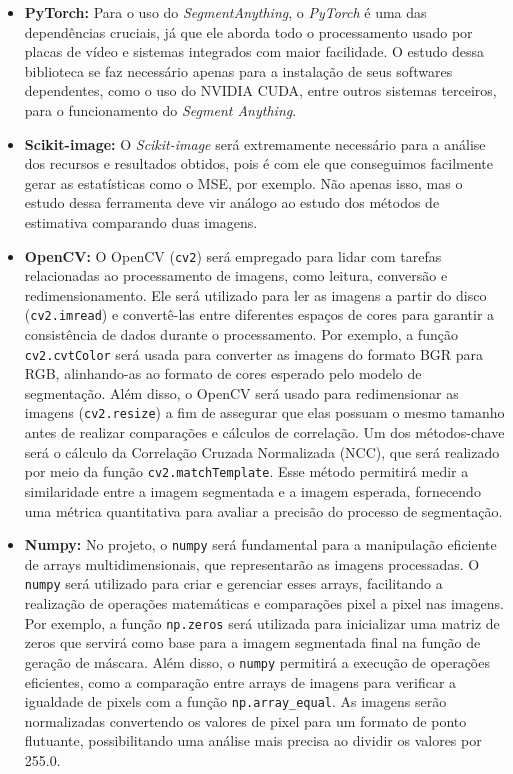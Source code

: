 \begin{itemize}
    \item \textbf{PyTorch:}  
    Para o uso do \textit{SegmentAnything}, o \textit{PyTorch} é uma das dependências cruciais, já que ele aborda todo o processamento usado por placas de vídeo e sistemas integrados com maior facilidade. O estudo dessa biblioteca se faz necessário apenas para a instalação de seus softwares dependentes, como o uso do NVIDIA CUDA, entre outros sistemas terceiros, para o funcionamento do \textit{Segment Anything}.

    \item \textbf{Scikit-image:}  
    O \textit{Scikit-image} será extremamente necessário para a análise dos recursos e resultados obtidos, pois é com ele que conseguimos facilmente gerar as estatísticas como o MSE, por exemplo. Não apenas isso, mas o estudo dessa ferramenta deve vir análogo ao estudo dos métodos de estimativa comparando duas imagens.

    \item \textbf{OpenCV:}  
    O OpenCV (\texttt{cv2}) será empregado para lidar com tarefas relacionadas ao processamento de imagens, como leitura, conversão e redimensionamento. Ele será utilizado para ler as imagens a partir do disco (\texttt{cv2.imread}) e convertê-las entre diferentes espaços de cores para garantir a consistência de dados durante o processamento. Por exemplo, a função \texttt{cv2.cvtColor} será usada para converter as imagens do formato BGR para RGB, alinhando-as ao formato de cores esperado pelo modelo de segmentação. Além disso, o OpenCV será usado para redimensionar as imagens (\texttt{cv2.resize}) a fim de assegurar que elas possuam o mesmo tamanho antes de realizar comparações e cálculos de correlação. Um dos métodos-chave será o cálculo da Correlação Cruzada Normalizada (NCC), que será realizado por meio da função \texttt{cv2.matchTemplate}. Esse método permitirá medir a similaridade entre a imagem segmentada e a imagem esperada, fornecendo uma métrica quantitativa para avaliar a precisão do processo de segmentação.

    \item \textbf{Numpy:}  
    No projeto, o \texttt{numpy} será fundamental para a manipulação eficiente de arrays multidimensionais, que representarão as imagens processadas. O \texttt{numpy} será utilizado para criar e gerenciar esses arrays, facilitando a realização de operações matemáticas e comparações pixel a pixel nas imagens. Por exemplo, a função \texttt{np.zeros} será utilizada para inicializar uma matriz de zeros que servirá como base para a imagem segmentada final na função de geração de máscara. Além disso, o \texttt{numpy} permitirá a execução de operações eficientes, como a comparação entre arrays de imagens para verificar a igualdade de pixels com a função \texttt{np.array\_equal}. As imagens serão normalizadas convertendo os valores de pixel para um formato de ponto flutuante, possibilitando uma análise mais precisa ao dividir os valores por 255.0.
\end{itemize}

